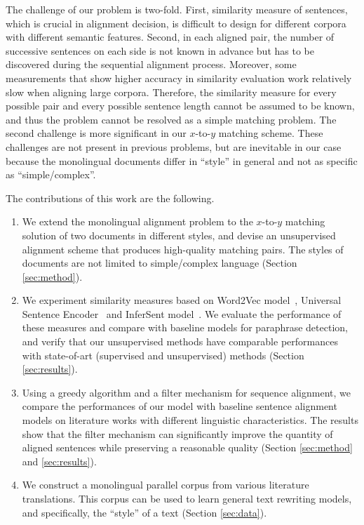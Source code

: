 The challenge of our problem is two-fold. First, similarity measure of sentences, which is crucial in alignment decision, is difficult to design for different corpora with different semantic features. Second, in each aligned pair, the number of successive sentences on each side is not known in advance but has to be discovered during the sequential alignment process. Moreover, some measurements that show higher accuracy in similarity evaluation work relatively slow when aligning large corpora. Therefore, the similarity measure for every possible pair and every possible sentence length cannot be assumed to be known, and thus the problem cannot be resolved as a simple matching problem. The second challenge is more significant in our $x$-to-$y$ matching scheme. These challenges are not present in previous problems, but are inevitable in our case because the monolingual documents differ in ``style'' in general and not as specific as ``simple/complex''.

The contributions of this work are the following.
\begin{enumerate}
	\item We extend the monolingual alignment problem to the $x$-to-$y$ matching solution of two documents in different styles, and devise an unsupervised alignment scheme that produces high-quality matching pairs. The styles of documents are not limited to simple/complex language (Section \ref{sec:method}).
	\item We experiment similarity measures based on Word2Vec model~\cite{mikolov2013distributed}, Universal Sentence Encoder~\cite{cer2018universal} and InferSent model~\cite{conneau2017supervised}. We evaluate the performance of these measures and compare with baseline models for paraphrase detection, and verify that our unsupervised methods have comparable performances with state-of-art (supervised and unsupervised) methods (Section \ref{sec:results}).
	\item Using a greedy algorithm and a filter mechanism for sequence alignment, we compare the performances of our model with baseline sentence alignment models on literature works with different linguistic characteristics. The results show that the filter mechanism can significantly improve the quantity of aligned sentences while preserving a reasonable quality (Section \ref{sec:method} and \ref{sec:results}).
	\item We construct a monolingual parallel corpus from various literature translations. This corpus can be used to learn general text rewriting models, and specifically, the ``style'' of a text (Section \ref{sec:data}).
\end{enumerate}


